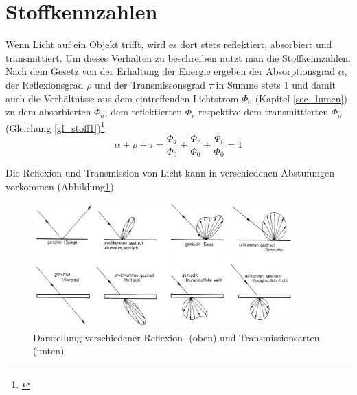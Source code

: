 \section{Stoffkennzahlen}
Wenn Licht auf ein Objekt trifft, wird es dort stets reflektiert, absorbiert und transmittiert. Um dieses Verhalten zu beschreiben nutzt man die Stoffkennzahlen. Nach dem Gesetz von der Erhaltung der Energie ergeben der Absorptionsgrad $\alpha$, der Reflexionsgrad $\rho$ und der Transmissonsgrad $\tau$ in Summe stets 1 und damit auch die Verhältnisse aus dem eintreffenden Lichtstrom $\Phi_{0}$ (Kapitel \ref{sec_lumen}) zu dem absorbierten $\Phi_{a}$, dem reflektierten $\Phi_{r}$ respektive dem transmittierten $\Phi_{d}$ (Gleichung \ref{gl_stoff1})\footnote{\cite[38]{hentschel}}.
\begin{equation}\label{gl_stoff1}
	\alpha + \rho + \tau = \frac{\Phi_{a}}{\Phi_{0}} + \frac{\Phi_{r}}{\Phi_{0}} + \frac{\Phi_{t}}{\Phi_{0}} = 1	
\end{equation}

Die Reflexion und Transmission von Licht kann in verschiedenen Abstufungen vorkommen (Abbildung\ref{b_reftrans}).

\begin{figure}[H]     %
\centering
\includegraphics[width=0.9\textwidth]{bilder/reftrans} 
\caption {Darstellung verschiedener Reflexion- (oben) und Transmissionsarten (unten) \protect\footnotemark}\label{b_reftrans}
\end{figure}

 


